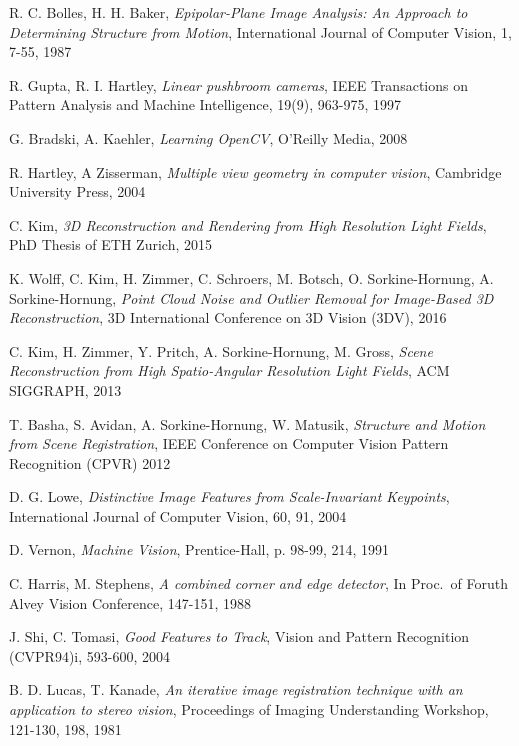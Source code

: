 \documentclass[11pt, english, singlespacing, headsepline, ]{MastersDoctoralThesis}
\theoremstyle{definition}
\begin{document}
\begin{thebibliography}{90}
	R. C. Bolles, H. H. Baker,
	\emph{Epipolar-Plane Image Analysis: An Approach to Determining Structure from Motion},
	International Journal of Computer Vision, 1, 7-55,
	1987

	R. Gupta, R. I. Hartley, 
	\emph{Linear pushbroom cameras},
	IEEE Transactions on Pattern Analysis and Machine Intelligence, 19(9), 963-975,
	1997

	G. Bradski, A. Kaehler,
	\emph{Learning OpenCV},
	O'Reilly Media, 2008

	R. Hartley, A Zisserman,
	\emph{Multiple view geometry in computer vision},
	Cambridge University Press,
	2004

	C. Kim, 
	\emph{3D Reconstruction and Rendering from High Resolution Light Fields},
	PhD Thesis of ETH Zurich, 2015

	K. Wolff, C. Kim, H. Zimmer, C. Schroers, M. Botsch, O. Sorkine-Hornung, A. Sorkine-Hornung,
	\emph{Point Cloud Noise and Outlier Removal for Image-Based 3D Reconstruction},
	3D International Conference on 3D Vision (3DV), 2016

	C. Kim, H. Zimmer, Y. Pritch, A. Sorkine-Hornung, M. Gross,
	\emph{Scene Reconstruction from High Spatio-Angular Resolution Light Fields},
	ACM SIGGRAPH, 2013

	T. Basha, S. Avidan, A. Sorkine-Hornung, W. Matusik,
	\emph{Structure and Motion from Scene Registration},
	IEEE Conference on Computer Vision Pattern Recognition (CPVR) 2012
	
	D. G. Lowe,
	\emph{Distinctive Image Features from Scale-Invariant Keypoints},
	International Journal of Computer Vision, 60, 91,
	2004 

	D. Vernon,
	\emph{Machine Vision},
	Prentice-Hall, p. 98-99, 214,
	1991
	
	C. Harris, M. Stephens, 
	\emph{A combined corner and edge detector},
	In Proc.\ of Foruth Alvey Vision Conference, 147-151,
	1988

	J. Shi, C. Tomasi,
	\emph{Good Features to Track},
	Vision and Pattern Recognition (CVPR94)i, 593-600,
	2004

	B. D. Lucas, T. Kanade,
	\emph{An iterative image registration technique with an application to stereo vision},
	Proceedings of Imaging Understanding Workshop, 121-130,
	198,
	1981


\end{thebibliography}
\end{document}
